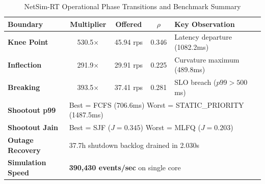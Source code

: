 \begin{table}[h]
\centering
\small
\caption{NetSim-RT Operational Phase Transitions and Benchmark Summary}
\label{tab:headline}
\begin{tabularx}{\columnwidth}{l c c c X}
\toprule
\textbf{Boundary} & \textbf{Multiplier} & \textbf{Offered} & \textbf{$\rho$} & \textbf{Key Observation} \\
\midrule
\textbf{Knee Point} & 530.5$\times$ & 45.94 rps & 0.346 & Latency departure (1082.2ms) \\
\textbf{Inflection} & 291.9$\times$ & 29.91 rps & 0.225 & Curvature maximum (489.8ms) \\
\textbf{Breaking} & 393.5$\times$ & 37.41 rps & 0.281 & SLO breach ($p99 > 500$ms) \\
\midrule
\textbf{Shootout p99} & \multicolumn{4}{l}{Best = FCFS (706.6ms) \quad Worst = STATIC_PRIORITY (1487.5ms)} \\
\textbf{Shootout Jain} & \multicolumn{4}{l}{Best = SJF ($J=0.345$) \quad Worst = MLFQ ($J=0.203$)} \\
\textbf{Outage Recovery} & \multicolumn{4}{l}{37.7h shutdown backlog drained in 2.030s} \\
\textbf{Simulation Speed} & \multicolumn{4}{l}{\textbf{390,430 events/sec} on single core} \\
\bottomrule
\end{tabularx}
\end{table}
